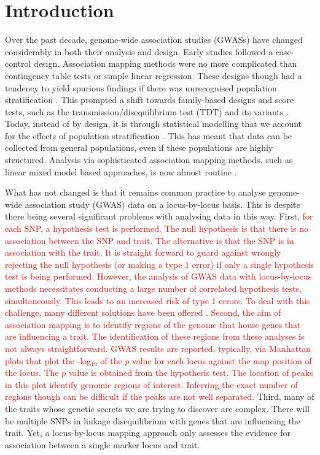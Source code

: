 \documentclass{article}
\begin{document}
\section{Introduction}
Over the past decade,  genome-wide association studies (GWASs) have changed considerably in both their analysis and design. Early studies
 followed a case-control design. Association mapping methods were no more complicated than contingency table tests or simple 
linear regression. These designs though had a tendency to yield spurious findings if there was unrecognised population stratification 
\citep{cardon2003population}. This prompted a shift towards family-based designs and score tests, such as the transmission/disequilibrium test (TDT)  and its variants \citep{spielman1996tdt}. Today, instead of by design, it is through statistical modelling that we account for the effects of population stratification \citep{price2010new}. This has meant that data can be collected from general populations, even if these populations are highly structured. Analysis via sophisticated association mapping methods, such as linear mixed model based approaches,  is now almost routine  \citep{yu2006unified,zhao2007arabidopsis}.




What has not changed is that it remains common practice to analyse genome-wide association study (GWAS) data on a locus-by-locus basis. This is despite there being several significant problems with analysing data in this way. 
First, \textcolor{red}{ for each SNP, a hypothesis test is performed. The null hypothesis is that  there is no association between the SNP and trait. 
The alternative is that the SNP is in association with the trait. It is straight forward to guard against wrongly rejecting the null 
hypothesis (or making a type 1 error) if only a single hypothesis test is being performed. However, the analysis of GWAS data 
with locus-by-locus methods necessitates  conducting a large number of correlated hypothesis tests, simultaneously. 
 This leads to an increased risk of type 1 errors.  To deal with this challenge, many different solutions have been offered 
 \citep{storey2003statistical, li2005adjusting, de2005efficiency}.  Second, 
the aim of association mapping is to identify regions of the genome that house genes that are influencing a trait. 
The identification of these regions from these analyses is not always straightforward. GWAS results are reported, typically, via Manhattan plots 
that plot the -log$_{10}$ of the $p$ value for each locus against the map position of the locus. The $p$ value is obtained from the hypothesis test. 
The location of peaks in this plot identify genomic 
regions of interest. Inferring the exact number of regions though can be difficult if the peaks are not well separated. }
 Third, many of the traits whose genetic secrets we are trying to discover are complex. There will be multiple SNPs in linkage disequilibrium with genes that are influencing the trait. Yet, a locus-by-locus mapping approach only assesses the evidence for association between a single marker locus and trait.
\end{document}
